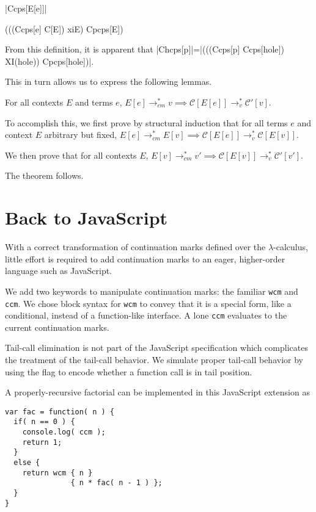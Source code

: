 \documentclass{llncs}
\newcommand{\lc}[0]{$\lambda$-calculus}
\newcommand{\lvrrs}[0]{\rightarrow_v^{*}}
\newcommand{\cmrrs}[0]{\rightarrow_{cm}^{*}}
\newcommand{\C}[1]{\mathcal{C}[#1]}
\newcommand{\Cp}[1]{\mathcal{C}'[#1]}
\begin{document}
\begin{schemedefn}{\scheme|Ccps[E[e]]|}
\begin{schemedisplay}
(((Ccps[e] C[E]) xiE) Cpcps[E])
\end{schemedisplay}
\end{schemedefn}

From this definition, it is apparent that \scheme|Chcps[p]|=\scheme|(((Ccps[p] Ccps[hole]) XI(hole)) Cpcps[hole])|.

This in turn allows us to express the following lemmas.

\begin{lemma}
For all contexts $E$ and terms $e$, $E[e]\cmrrs v\implies\C{E[e]}\lvrrs\Cp{v}$.
\end{lemma}

To accomplish this, we first prove by structural induction that for all terms $e$ and context $E$ arbitrary but fixed, $E[e]\cmrrs E[v]\implies\C{E[e]}\lvrrs\C{E[v]}$. 

We then prove that for all contexts $E$, $E[v]\cmrrs v'\implies\C{E[v]}\lvrrs\Cp{v'}$.

The theorem follows.

\section{Back to JavaScript}
\label{sec-javascript}

With a correct transformation of continuation marks defined over the \lc, little effort is required to add continuation marks to an eager, higher-order language such as JavaScript.

We add two keywords to manipulate continuation marks: the familiar \texttt{wcm} and \texttt{ccm}. We chose block syntax for \texttt{wcm} to convey that it is a special form, like a conditional, instead of a function-like interface. A lone \texttt{ccm} evaluates to the current continuation marks.

Tail-call elimination is not part of the JavaScript specification which complicates the treatment of the tail-call behavior. We simulate proper tail-call behavior by using the flag to encode whether a function call is in tail position.

A properly-recursive factorial can be implemented in this JavaScript extension as
\begin{verbatim}
var fac = function( n ) {
  if( n == 0 ) {
    console.log( ccm );
    return 1;
  }
  else {
    return wcm { n }
               { n * fac( n - 1 ) };
  }
}
\end{verbatim}
\end{document}
